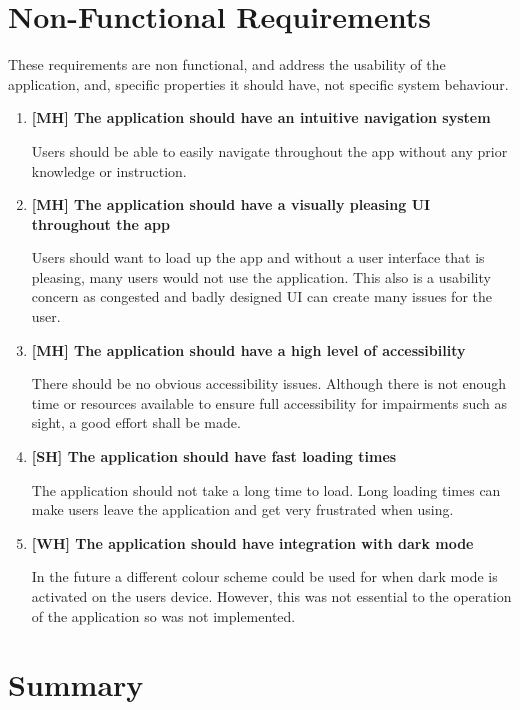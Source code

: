 \section{Non-Functional Requirements} \label{non-functional}
These requirements are non functional, and address the usability of the application, and, specific properties it should have, not specific system behaviour. 
\begin{enumerate}
    \item \textbf{[MH] The application should have an intuitive navigation system }\par
    Users should be able to easily navigate throughout the app without any prior knowledge or instruction.
    \item \textbf{[MH] The application should have a visually pleasing UI throughout the app }\par
    Users should want to load up the app and without a user interface that is pleasing, many users would not use the application. This also is a usability concern as congested and badly designed UI can create many issues for the user.
    \item \textbf{[MH] The application should have a high level of accessibility }\par
    There should be no obvious accessibility issues. Although there is not enough time or resources available to ensure full accessibility for impairments such as sight, a good effort shall be made.
    \item \textbf{[SH] The application should have fast loading times }\par
    The application should not take a long time to load. Long loading times can make users leave the application and get very frustrated when using.
    \item \textbf{[WH] The application should have integration with dark mode }\par
    In the future a different colour scheme could be used for when dark mode is activated on the users device. However, this was not essential to the operation of the application so was not implemented. 
\end{enumerate}
\section{Summary}